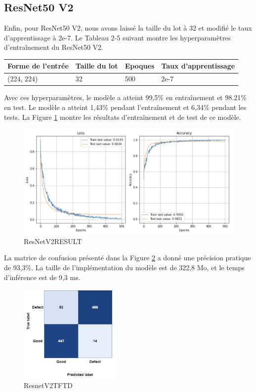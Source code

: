 \subsection{ResNet50 V2 }
Enfin, pour ResNet50 V2, nous avons laissé la taille du lot à 32 et modifié le taux d'apprentissage à 2e-7. Le Tableau 2-5 suivant montre les hyperparamètres d'entraînement du ResNet50 V2. 
\begin{table}[h]
    \begin{center}
        \begin{tabular}{|l|l|l|l|}
            \hline
            Forme de l'entrée & Taille du lot & Epoques & Taux d'apprentissage \\ \hline
            (224, 224)        & 32            & 500     & 2e-7                  \\ \hline
            \end{tabular}
    \end{center}
    \end{table}
    Avec ces hyperparamètres, le modèle a atteint 99,5\% en entraînement et 98.21\% en test. Le modèle a atteint 1,43\% pendant l'entraînement et 6,34\% pendant les tests. La Figure \ref{ResNet50V2RESULT} montre les résultats d'entraînement et de test de ce modèle.
    \begin{figure}[h]
        \centering
        \includegraphics[width=13cm]{assets/PartTwo/ChapterTwo/ResNetV2RESULT.png}
        \caption{ResNetV2RESULT}
        \label{ResNet50V2RESULT}
        \end{figure} 
        La matrice de confusion présenté dans la Figure \ref{ResnetV2TFTD} a donné une précision pratique de 93,3\%. La taille de l'implémentation du modèle est de 322,8 Mo, et le temps d'inférence est de 9,3 ms. 

    \begin{figure}[h]
            \centering
            \includegraphics[width=5cm]{assets/PartTwo/ChapterTwo/ResnetV2TFTD.png}
            \caption{ResnetV2TFTD}
            \label{ResnetV2TFTD}
            \end{figure}
        \newpage

